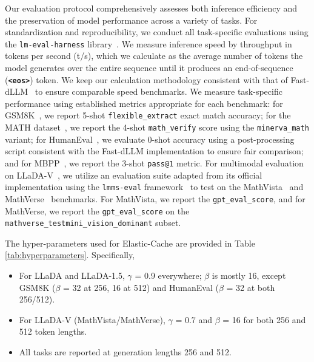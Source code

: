 \documentclass{article} %
\theoremstyle{definition}
\theoremstyle{remark}
\begin{document}
Our evaluation protocol comprehensively assesses both inference efficiency and the preservation of model performance across a variety of tasks. For standardization and reproducibility, we conduct all task-specific evaluations using the \texttt{lm-eval-harness} library~\citep{eval-harness}. We measure inference speed by throughput in tokens per second (t/s), which we calculate as the average number of tokens the model generates over the entire sequence until it produces an end-of-sequence (\textbf{\texttt{<eos>}}) token. We keep our calculation methodology consistent with that of Fast-dLLM~\citep{wu2025fast} to ensure comparable speed benchmarks. We measure task-specific performance using established metrics appropriate for each benchmark: for GSM8K~\citep{cobbe2021training}, we report 5-shot \texttt{flexible\_extract} exact match accuracy; for the MATH dataset~\citep{hendrycks2021measuring}, we report the 4-shot \texttt{math\_verify} score using the \texttt{minerva\_math} variant; for HumanEval~\citep{chen2021evaluating}, we evaluate 0-shot accuracy using a post-processing script consistent with the Fast-dLLM implementation to ensure fair comparison; and for MBPP~\citep{austin2021program}, we report the 3-shot \texttt{pass@1} metric. For multimodal evaluation on LLaDA-V~\citep{you2025llada}, we utilize an evaluation suite adapted from its official implementation using the \texttt{lmms-eval} framework~\citep{zhang2024lmmsevalrealitycheckevaluation,lmms_eval2024} to test on the MathVista~\citep{lu2023mathvista} and MathVerse~\citep{zhang2024mathverse} benchmarks. For MathVista, we report the \texttt{gpt\_eval\_score}, and for MathVerse, we report the \texttt{gpt\_eval\_score} on the \texttt{mathverse\_testmini\_vision\_dominant} subset.

 The hyper-parameters used for Elastic-Cache are provided in Table \ref{tab:hyperparameters}. Specifically, 
\begin{itemize}
    \item For LLaDA and LLaDA-1.5, $\gamma$ = 0.9 everywhere; $\beta$ is mostly 16, except GSM8K ($\beta$ = 32 at 256, 16 at 512) and HumanEval ($\beta$ = 32 at both 256/512). 
    \item For LLaDA-V (MathVista/MathVerse), $\gamma$ = 0.7 and $\beta$ = 16 for both 256 and 512 token lengths.	
    \item All tasks are reported at generation lengths 256 and 512.
\end{itemize}
\end{document}
